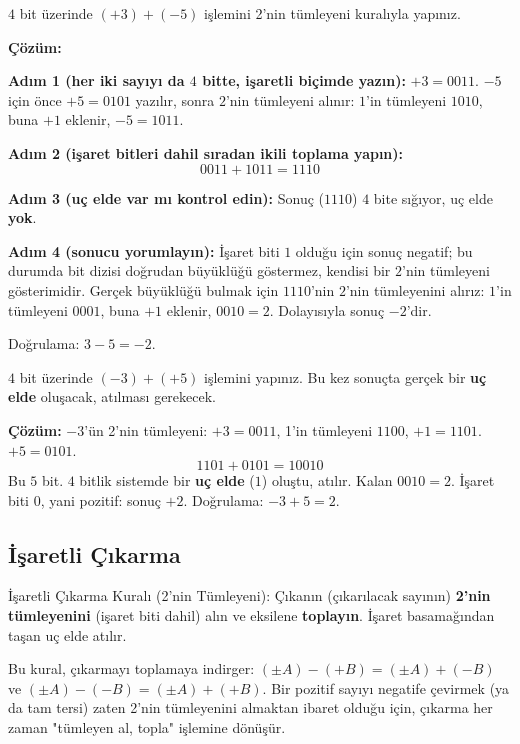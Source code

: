 \begin{alistirma}[\kolay]
$4$ bit üzerinde $(+3)+(-5)$ işlemini 2'nin tümleyeni kuralıyla yapınız.
\end{alistirma}

\noindent\textbf{Çözüm:}

\noindent\textbf{Adım 1 (her iki sayıyı da $4$ bitte, işaretli biçimde yazın):} $+3=0011$.
$-5$ için önce $+5=0101$ yazılır, sonra $2$'nin tümleyeni alınır: $1$'in tümleyeni
$1010$, buna $+1$ eklenir, $-5=1011$.

\noindent\textbf{Adım 2 (işaret bitleri dahil sıradan ikili toplama yapın):}
\[
0011+1011=1110
\]

\noindent\textbf{Adım 3 (uç elde var mı kontrol edin):} Sonuç ($1110$) $4$ bite sığıyor,
uç elde \textbf{yok}.

\noindent\textbf{Adım 4 (sonucu yorumlayın):} İşaret biti $1$ olduğu için sonuç negatif;
bu durumda bit dizisi doğrudan büyüklüğü göstermez, kendisi bir $2$'nin tümleyeni
gösterimidir. Gerçek büyüklüğü bulmak için $1110$'nin $2$'nin tümleyenini alırız: $1$'in
tümleyeni $0001$, buna $+1$ eklenir, $0010=2$. Dolayısıyla sonuç $-2$'dir.

Doğrulama: $3-5=-2$. \checkmark

\begin{alistirma}[\orta]
$4$ bit üzerinde $(-3)+(+5)$ işlemini yapınız. Bu kez sonuçta gerçek bir \textbf{uç elde}
oluşacak, atılması gerekecek.
\end{alistirma}

\noindent\textbf{Çözüm:} $-3$'ün 2'nin tümleyeni: $+3=0011$, 1'in tümleyeni $1100$,
$+1=1101$. $+5=0101$.
\[
1101+0101=10010
\]
Bu $5$ bit. $4$ bitlik sistemde bir \textbf{uç elde} ($1$) oluştu, atılır. Kalan
$0010=2$. İşaret biti $0$, yani pozitif: sonuç $+2$. Doğrulama: $-3+5=2$. \checkmark

\subsection{İşaretli Çıkarma}
\label{sec:isaretli-cikarma}

\begin{tanim}{İşaretli Çıkarma Kuralı (2'nin Tümleyeni):}
Çıkanın (çıkarılacak sayının) \textbf{2'nin tümleyenini} (işaret biti dahil) alın ve
eksilene \textbf{toplayın}. İşaret basamağından taşan uç elde atılır.
\end{tanim}

Bu kural, çıkarmayı toplamaya indirger: $(\pm A)-(+B)=(\pm A)+(-B)$ ve
$(\pm A)-(-B)=(\pm A)+(+B)$. Bir pozitif sayıyı negatife çevirmek (ya da tam tersi) zaten
2'nin tümleyenini almaktan ibaret olduğu için, çıkarma her zaman "tümleyen al, topla"
işlemine dönüşür.

